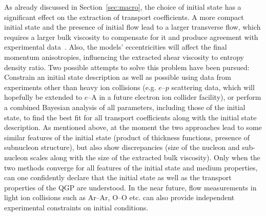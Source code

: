 As already discussed in Section~\ref{sec:macro}, the choice of initial state has 
  a significant effect on the extraction of transport coefficients. 
A more compact initial state and the presence of initial flow lead to a larger 
  transverse flow, which requires a larger bulk viscosity to compensate for it 
  and produce agreement with experimental data~\cite{Schenke:2018fci}. 
Also, the models' eccentricities will affect the final momentum anisotropies, 
  influencing the extracted shear viscosity to entropy density ratio. 
Two possible attempts to solve this problem have been pursued: Constrain an 
  initial state description as well as possible using data from experiments 
  other than heavy ion collisions (e.g. $e$--$p$ scattering data, which will hopefully 
  be extended to $e$--A in a future electron ion collider facility), or perform a 
  combined Bayesian analysis of all parameters, including those of the initial state, 
  to find the best fit for all transport coefficients along with the initial 
  state description.
As mentioned above, at the moment the two approaches lead to some similar 
  features of the initial state (product of thickness functions, presence 
  of subnucleon structure), but also show discrepancies (size of the nucleon 
  and sub-nucleon scales along with the size of the extracted bulk viscosity). 
Only when the two methods converge for all features of the initial state and 
  medium properties, can one confidently declare that the initial state as well 
  as the transport properties of the QGP are understood.
In the near future, flow measurements in light ion collisions such as 
  Ar--Ar, O--O etc. can also provide independent experimental constraints 
  on initial conditions. 









